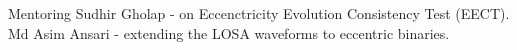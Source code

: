 \begin{rubric}{Mentoring}
\entry*[] Sudhir Gholap - on Eccenctricity Evolution Consistency Test (EECT).
%
\entry*[] Md Asim Ansari - extending the LOSA waveforms to eccentric binaries.
%

\end{rubric}
